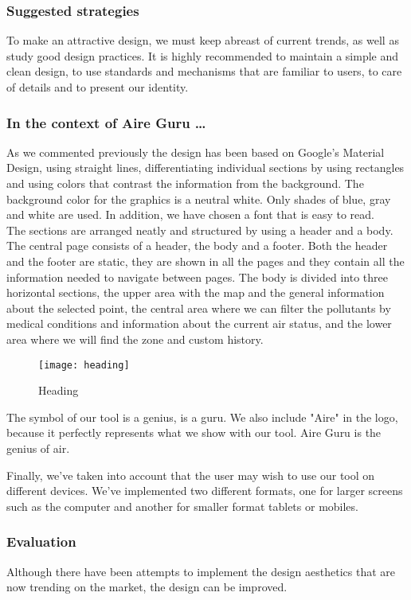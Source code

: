 \subsubsection*{Suggested strategies}

To make an attractive design, we must keep abreast of current trends, as well as study good design practices.
It is highly recommended to maintain a simple and clean design, to use standards and mechanisms that are familiar to users,
to care of details and to present our identity.

\subsubsection*{In the context of Aire Guru \ldots}

As we commented previously the design has been based on Google's Material Design, using straight lines, differentiating individual sections by using rectangles and using colors that contrast the information from the background.
The background color for the graphics is a neutral white. Only shades of blue, gray and white are used. In addition, we have chosen a font that is easy to read.\\

The sections are arranged neatly and structured by using a header and a body.\\

The central page consists of a header, the body and a footer. Both the header and the footer are static,
they are shown in all the pages and they contain all the information needed to navigate between pages.
The body is divided into three horizontal sections, the upper area with the map and the general information about the selected point,
the central area where we can filter the pollutants by medical conditions and information about the current air status, and the
lower area where we will find the zone and custom history.

\begin{figure}[ht]
    \centering
    \texttt{[image: heading]}
    \caption{Heading}
\end{figure}
 
    The symbol of our tool is a genius, is a guru. We also include "Aire" in the logo, because it perfectly represents 
    what we show with our tool. Aire Guru is the genius of air.
    
    Finally, we've taken into account that the user may wish to use our tool on different devices. We've implemented
    two different formats, one for larger screens such as the computer and another for smaller format tablets or mobiles.

\subsubsection*{Evaluation}  

\begin{itemize}
    \done
    \crossed Although there have been attempts to implement the design aesthetics that are now trending on the market, the design can be improved.
\end{itemize}